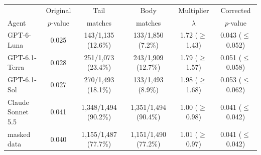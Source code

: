\begin{tabular}{@{}lccccc@{}}
\toprule
 & Original & Tail & Body & Multiplier & Corrected \\
Agent & $p$-value & matches & matches & $\lambda$ & $p$-value \\
\midrule
GPT-6-Luna & 0.025 & 143/1,135 (12.6\%) & 133/1,850 (7.2\%) & 1.72 ($\geq$ 1.43) & 0.043 ($\leq$ 0.052) \\
GPT-6.1-Terra & 0.028 & 251/1,073 (23.4\%) & 243/1,909 (12.7\%) & 1.79 ($\geq$ 1.57) & 0.051 ($\leq$ 0.058) \\
GPT-6.1-Sol & 0.027 & 270/1,493 (18.1\%) & 133/1,493 (8.9\%) & 1.98 ($\geq$ 1.68) & 0.053 ($\leq$ 0.062) \\
Claude Sonnet 5.5 & 0.041 & 1,348/1,494 (90.2\%) & 1,351/1,494 (90.4\%) & 1.00 ($\geq$ 0.98) & 0.041 ($\leq$ 0.042) \\
\quad masked data & 0.040 & 1,155/1,487 (77.7\%) & 1,151/1,490 (77.2\%) & 1.01 ($\geq$ 0.97) & 0.041 ($\leq$ 0.042) \\
\bottomrule
\end{tabular}
